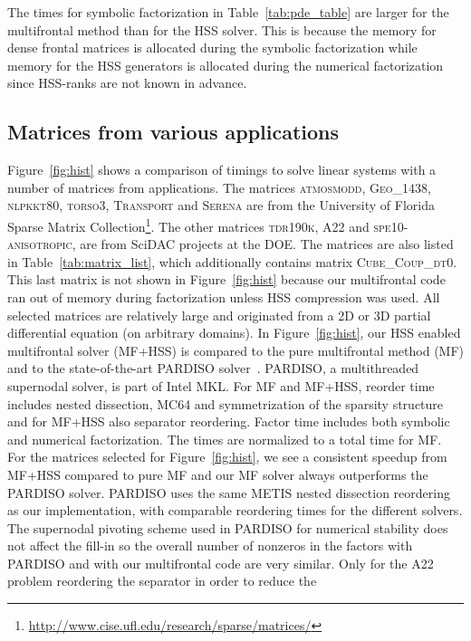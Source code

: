 \documentclass{article}
\newcommand{\tm}{\textsuperscript{\textregistered}}
\begin{document}
The times for symbolic factorization in Table~\ref{tab:pde_table} are
larger for the multifrontal method than for the HSS solver. This is
because the memory for dense frontal matrices is allocated during the
symbolic factorization while memory for the HSS generators is
allocated during the numerical factorization since HSS-ranks are not
known in advance.

\subsection{Matrices from various applications}
Figure~\ref{fig:hist} shows a comparison of timings to solve linear
systems with a number of matrices from applications. The matrices
\textsc{atmosmodd}, \textsc{Geo\_1438}, \textsc{nlpkkt80},
\textsc{torso3}, \textsc{Transport} and \textsc{Serena} are from the
University of Florida Sparse Matrix
Collection\footnote{\url{http://www.cise.ufl.edu/research/sparse/matrices/}}. The
other matrices \textsc{tdr190k}, \textsc{A22} and
\textsc{spe10-anisotropic}, are from SciDAC projects at the DOE. The
matrices are also listed in Table~\ref{tab:matrix_list}, which
additionally contains matrix \textsc{Cube\_Coup\_dt0}. This last
matrix is not shown in Figure~\ref{fig:hist} because our multifrontal
code ran out of memory during factorization unless HSS compression was
used. All selected matrices are relatively large and originated from a
2D or 3D partial differential equation (on arbitrary domains). In
Figure~\ref{fig:hist}, our HSS enabled multifrontal solver (MF+HSS) is
compared to the pure multifrontal method (MF) and to the
state-of-the-art PARDISO solver~\cite{schenk2000efficient}. PARDISO, a
multithreaded supernodal solver, is part of Intel\tm{} MKL. For MF and
MF+HSS, reorder time includes nested dissection, MC64 and
symmetrization of the sparsity structure and for MF+HSS also separator
reordering. Factor time includes both symbolic and numerical
factorization. The times are normalized to a total time  for
MF. For the matrices selected for Figure~\ref{fig:hist}, we see a
consistent speedup from MF+HSS compared to pure MF and our MF solver
always outperforms the PARDISO solver. PARDISO uses the same METIS
nested dissection reordering as our implementation, with comparable
reordering times for the different solvers. The supernodal pivoting
scheme used in PARDISO for numerical stability does not affect the
fill-in so the overall number of nonzeros in the factors with PARDISO
and with our multifrontal code are very similar. Only for the
\textsc{A22} problem reordering the separator in order to reduce the
\end{document}
